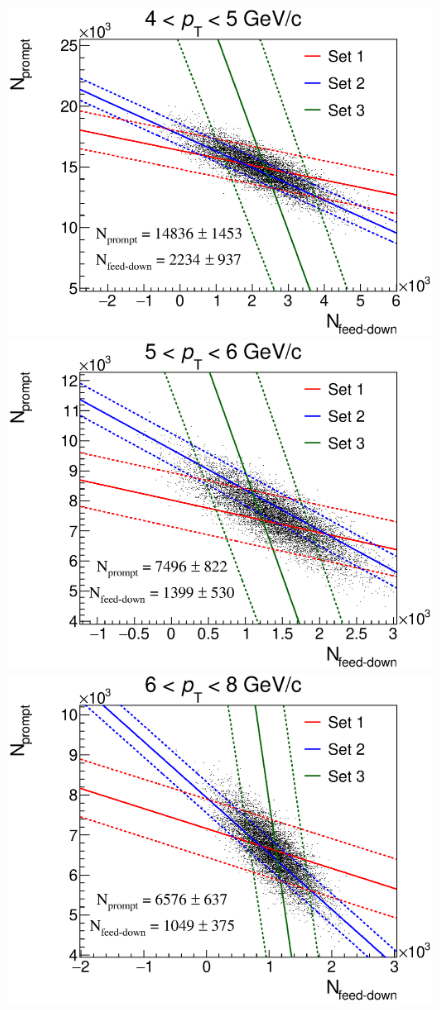 \documentclass[b5paper,10pt,twoside,oldstyle,classica]{toptesi}
\begin{document}
\begin{figure}[h]
\begin{center}
{\includegraphics[scale = 0.25]{LinesDisp_4-5.eps}}
\hspace{0cm}
{\includegraphics[scale = 0.25]{LinesDisp_5-6.eps}}
\vspace{0cm}
{\includegraphics[scale = 0.25]{LinesDisp_6-8.eps}}

\end{center}
\end{figure}
\end{document}
